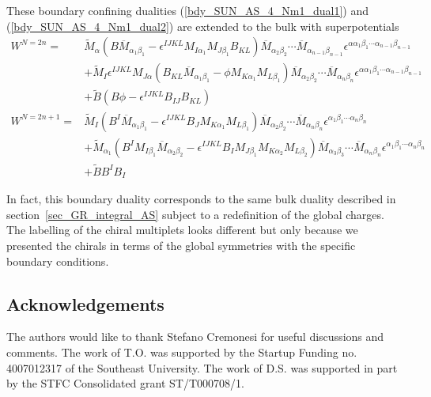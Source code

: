 \documentclass[12pt]{article}
\numberwithin{equation}{section}
\begin{document}
These boundary confining dualities (\ref{bdy_SUN_AS_4_Nm1_dual1}) and (\ref{bdy_SUN_AS_4_Nm1_dual2}) are extended to the bulk with superpotentials
\begin{align}
    W^{N = 2n} = & \widetilde{M}_{\alpha} \left( B \overline{M}_{\alpha_1 \beta_1} - \epsilon^{IJKL} M_{I \alpha_1} M_{J \beta_1} B_{KL} \right) \overline{M}_{\alpha_2 \beta_2} \cdots \overline{M}_{\alpha_{n-1} \beta_{n-1}} \epsilon^{\alpha \alpha_1 \beta_1 \cdots \alpha_{n-1} \beta_{n-1}}
    \nonumber \\
    & + \widetilde{M}_I \epsilon^{IJKL} M_{J \alpha} \left( B_{KL} \overline{M}_{\alpha_1 \beta_1} - \phi M_{K \alpha_1} M_{L \beta_1} \right) \overline{M}_{\alpha_2 \beta_2} \cdots \overline{M}_{\alpha_n \beta_n} \epsilon^{\alpha \alpha_1 \beta_1 \cdots \alpha_{n-1} \beta_{n-1}}
    \nonumber \\
    & + \widetilde{B} \left( B \phi - \epsilon^{IJKL} B_{IJ} B_{KL} \right)
    \\
    W^{N = 2n+1} = & \widetilde{M}_I \left( B^I \overline{M}_{\alpha_1 \beta_1} - \epsilon^{IJKL} B_J M_{K \alpha_1} M_{L \beta_1} \right) \overline{M}_{\alpha_2 \beta_2} \cdots \overline{M}_{\alpha_n \beta_n} \epsilon^{\alpha_1 \beta_1 \cdots \alpha_n \beta_n}
    \nonumber \\
    & + \widetilde{M}_{\alpha_1} \left( B^I M_{I \beta_1} \overline{M}_{\alpha_2 \beta_2} - \epsilon^{IJKL} B_I M_{J \beta_1} M_{K \alpha_2} M_{L \beta_2} \right) \overline{M}_{\alpha_3 \beta_3} \cdots \overline{M}_{\alpha_n \beta_n} \epsilon^{\alpha_1 \beta_1 \cdots \alpha_n \beta_n}
    \nonumber \\
    & + \widetilde{B} B^I B_I
\end{align}

In fact, this boundary duality corresponds to the same bulk duality described in section~\ref{sec_GR_integral_AS} subject to a redefinition of the global charges. The labelling of the chiral multiplets looks different but only because we presented the chirals in terms of the global symmetries with the specific boundary conditions.



\subsection*{Acknowledgements}
The authors would like to thank Stefano Cremonesi for useful discussions and comments. 
The work of T.O. was supported by the Startup Funding no. 4007012317 of the Southeast University. 
The work of D.S. was supported in part by the STFC Consolidated grant ST/T000708/1.




\end{document}
